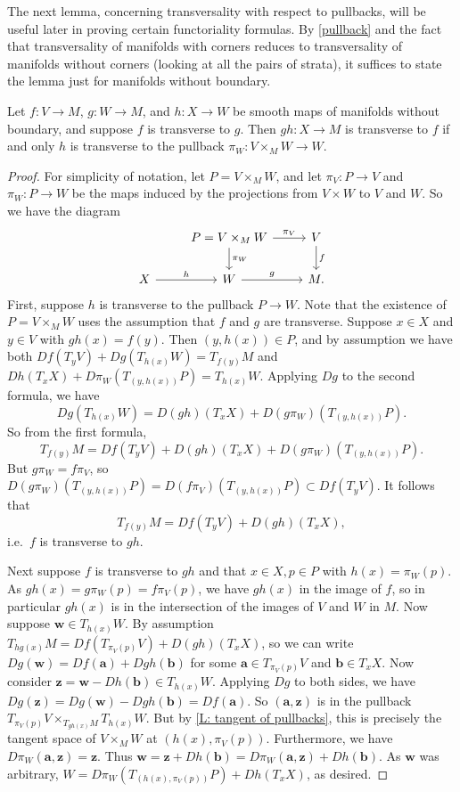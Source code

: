 The next lemma, concerning transversality with respect to pullbacks, will be useful later in proving certain functoriality formulas.
By \cref{pullback} and the fact that transversality of manifolds with corners reduces to transversality of manifolds without corners (looking at all the pairs of strata), it suffices to state the lemma just for manifolds without boundary.

\begin{lemma}\label{L: transverse to pullback}
	Let $f \colon V \to M$, $g \colon W \to M$, and $h \colon X \to W$ be smooth maps of manifolds without boundary, and suppose $f$ is transverse to $g$.
	Then $gh \colon X \to M$ is transverse to $f$ if and only $h$ is transverse to the pullback $\pi_W \colon V \times_M W \to W$.
\end{lemma}

\begin{proof}
	For simplicity of notation, let $P = V \times_MW$, and let $\pi_V \colon P \to V$ and $\pi_W \colon P \to W$ be the maps induced by the projections from $V \times W$ to $V$ and $W$.
	So we have the diagram
	\[
	\begin{tikzcd}
		& P = V \times_M W \arrow[r, "\pi_V"] \arrow[d, "\pi_W"] & V \arrow[d, "f"] \\
		X \arrow[r, "h"] & W \arrow[r, "g"]& M.
	\end{tikzcd}
	\]
	First, suppose $h$ is transverse to the pullback $P \to W$.
	Note that the existence of $P = V \times_M W$ uses the assumption that $f$ and $g$ are transverse.
	Suppose $x \in X$ and $y \in V$ with $gh(x) = f(y)$.
	Then $(y,h(x)) \in P$, and by assumption we have both $Df(T_yV)+Dg(T_{h(x)}W) = T_{f(y)}M$ and
	$Dh(T_xX)+D\pi_W(T_{(y,h(x))}P) = T_{h(x)}W$.
	Applying $Dg$ to the second formula, we have
	$$Dg(T_{h(x)}W) = D(gh)(T_xX)+D(g\pi_W)(T_{(y,h(x))}P).$$
	So from the first formula,
	$$T_{f(y)}M = Df(T_yV)+D(gh)(T_xX)+D(g\pi_W)(T_{(y,h(x))}P).$$
	But $g\pi_W = f\pi_V$, so $D(g\pi_W)(T_{(y,h(x))}P) = D(f\pi_V)(T_{(y,h(x))}P) \subset Df(T_yV)$.
	It follows that
	$$T_{f(y)}M = Df(T_yV)+D(gh)(T_xX),$$
	i.e.\ $f$ is transverse to $gh$.

	Next suppose $f$ is transverse to $gh$ and that $x \in X, p \in P$ with $h(x) = \pi_W(p)$.
	As $gh(x) = g\pi_W(p) = f\pi_V(p)$, we have $gh(x)$ in the image of $f$, so in particular $gh(x)$ is in the intersection of the images of $V$ and $W$ in $M$.
	Now suppose $\mathbf w \in T_{h(x)}W$.
	By assumption $T_{hg(x)}M = Df(T_{\pi_V(p)}V)+D(gh)(T_xX)$, so we can write $Dg(\mathbf w) = Df(\mathbf a)+Dgh(\mathbf b)$ for some $\mathbf a \in T_{\pi_V(p)}V$ and $\mathbf b \in T_x X$.
	Now consider $\mathbf z = \mathbf w-Dh(\mathbf b) \in T_{h(x)}W$.
	Applying $Dg$ to both sides, we have $Dg(\mathbf z) = Dg(\mathbf w)-Dgh(\mathbf b) = Df(\mathbf a)$.
	So $(\mathbf a,\mathbf z)$ is in the pullback $T_{\pi_V(p)}V \times_{T_{gh(x)}M} T_{h(x)}W$.
	But by \cref{L: tangent of pullbacks}, this is precisely the tangent space of $V \times_MW$ at $(h(x),\pi_V(p))$.
	Furthermore, we have $D\pi_W(\mathbf a,\mathbf z) = \mathbf z$.
	Thus $\mathbf w = \mathbf z+Dh(\mathbf b) = D\pi_W(\mathbf a,\mathbf z)+Dh(\mathbf b)$.
	As $\mathbf w$ was arbitrary, $W = D\pi_W(T_{(h(x),\pi_V(p))}P)+Dh(T_xX)$, as desired.
\end{proof}

